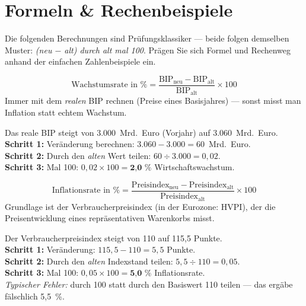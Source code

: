 \documentclass[11pt, a4paper]{article}
\begin{document}
\section{Formeln \& Rechenbeispiele}

Die folgenden Berechnungen sind Prüfungsklassiker --- beide folgen demselben Muster:
\emph{(neu $-$ alt) durch alt mal 100}. Prägen Sie sich Formel und Rechenweg anhand der
einfachen Zahlenbeispiele ein.

\begin{merksatz}[title={\bfseries Formel 1: Wirtschaftswachstum (Veränderungsrate des realen BIP)}]
\[
\text{Wachstumsrate in \%} =
\frac{\text{BIP}_{\text{neu}} - \text{BIP}_{\text{alt}}}{\text{BIP}_{\text{alt}}} \times 100
\]
Immer mit dem \emph{realen} BIP rechnen (Preise eines Basisjahres) --- sonst misst man
Inflation statt echtem Wachstum.
\end{merksatz}

\begin{beispiel}
Das reale BIP steigt von 3.000~Mrd.~Euro (Vorjahr) auf 3.060~Mrd.~Euro.\\[0.3em]
\textbf{Schritt 1:} Veränderung berechnen: $3.060 - 3.000 = 60$~Mrd.~Euro.\\
\textbf{Schritt 2:} Durch den \emph{alten} Wert teilen: $60 \div 3.000 = 0{,}02$.\\
\textbf{Schritt 3:} Mal 100: $0{,}02 \times 100 = \textbf{2{,}0~\%}$ Wirtschaftswachstum.
\end{beispiel}

\begin{merksatz}[title={\bfseries Formel 2: Inflationsrate (Veränderungsrate des Preisindex)}]
\[
\text{Inflationsrate in \%} =
\frac{\text{Preisindex}_{\text{neu}} - \text{Preisindex}_{\text{alt}}}{\text{Preisindex}_{\text{alt}}} \times 100
\]
Grundlage ist der Verbraucherpreisindex (in der Eurozone: HVPI), der die Preisentwicklung
eines repräsentativen Warenkorbs misst.
\end{merksatz}

\begin{beispiel}
Der Verbraucherpreisindex steigt von 110 auf 115,5 Punkte.\\[0.3em]
\textbf{Schritt 1:} Veränderung: $115{,}5 - 110 = 5{,}5$ Punkte.\\
\textbf{Schritt 2:} Durch den \emph{alten} Indexstand teilen: $5{,}5 \div 110 = 0{,}05$.\\
\textbf{Schritt 3:} Mal 100: $0{,}05 \times 100 = \textbf{5{,}0~\%}$ Inflationsrate.\\[0.3em]
\emph{Typischer Fehler:} durch 100 statt durch den Basiswert 110 teilen --- das ergäbe
fälschlich 5,5~\%.
\end{beispiel}
\end{document}
